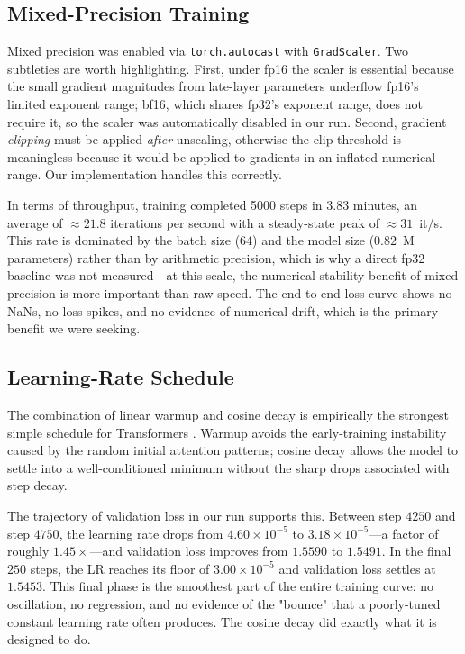 \subsection{Mixed-Precision Training}
Mixed precision was enabled via \texttt{torch.autocast} with
\texttt{GradScaler}. Two subtleties are worth highlighting. First, under
fp16 the scaler is essential because the small gradient magnitudes from
late-layer parameters underflow fp16's limited exponent range; bf16, which
shares fp32's exponent range, does not require it, so the scaler was
automatically disabled in our run. Second, gradient \emph{clipping} must be
applied \emph{after} unscaling, otherwise the clip threshold is meaningless
because it would be applied to gradients in an inflated numerical range.
Our implementation handles this correctly.

\noindent In terms of throughput, training completed 5000 steps in $3.83$ minutes,
an average of $\approx 21.8$ iterations per second with a steady-state
peak of $\approx 31$~it/s. This rate is dominated by the batch size
($64$) and the model size ($0.82$~M parameters) rather than by arithmetic
precision, which is why a direct fp32 baseline was not measured---at this
scale, the numerical-stability benefit of mixed precision is more
important than raw speed. The end-to-end loss curve shows no NaNs, no
loss spikes, and no evidence of numerical drift, which is the primary
benefit we were seeking.

\subsection{Learning-Rate Schedule}
The combination of linear warmup and cosine decay is empirically the
strongest simple schedule for Transformers \parencite{loshchilov2017sgdr}.
Warmup avoids the early-training instability caused by the random initial
attention patterns; cosine decay allows the model to settle into a
well-conditioned minimum without the sharp drops associated with step
decay.

\noindent The trajectory of validation loss in our run supports this. Between step
$4250$ and step $4750$, the learning rate drops from $4.60 \times 10^{-5}$
to $3.18 \times 10^{-5}$---a factor of roughly $1.45\times$---and
validation loss improves from $1.5590$ to $1.5491$. In the final $250$
steps, the LR reaches its floor of $3.00 \times 10^{-5}$ and validation
loss settles at $1.5453$. This final phase is the smoothest part of the
entire training curve: no oscillation, no regression, and no evidence of
the "bounce" that a poorly-tuned constant learning rate often produces.
The cosine decay did exactly what it is designed to do.

